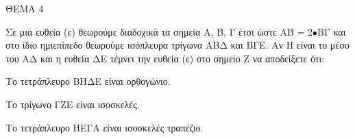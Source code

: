 
ΘΕΜΑ 4

Σε μια ευθεία (ε) θεωρούμε διαδοχικά τα σημεία Α, Β, Γ έτσι ώστε ΑΒ = 2$\bullet$ΒΓ και στο ίδιο ημιεπίπεδο θεωρούμε ισόπλευρα τρίγωνα ΑΒΔ και ΒΓΕ. Αν Η είναι το μέσο του ΑΔ και η ευθεία ΔΕ τέμνει την ευθεία (ε) στο σημείο Ζ να αποδείξετε ότι:

\begin{alist}
\item Το τετράπλευρο ΒΗΔΕ είναι ορθογώνιο. 

\item Το τρίγωνο ΓΖΕ είναι ισοσκελές. 

\item Το τετράπλευρο ΗΕΓΑ είναι ισοσκελές τραπέζιο. 


\end{alist}
